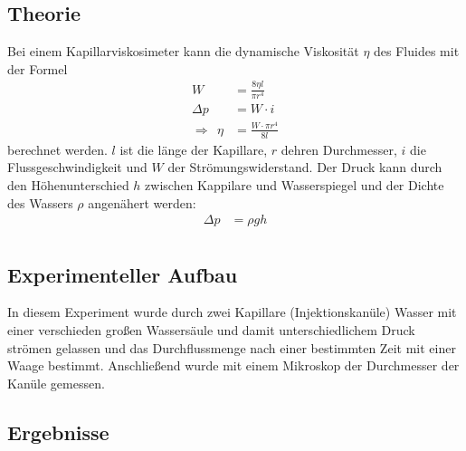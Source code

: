 \documentclass[11pt, a4paper]{article}
\begin{document}
    \subsection{Theorie}

    Bei einem Kapillarviskosimeter kann die dynamische Viskosität $\eta$ des Fluides mit der Formel
    \begin{align}
        W &= \frac{8 \eta l}{\pi r^4} \\
        \Delta p &= W \cdot i \\
        \Rightarrow \ \ \eta &= \frac{W \cdot \pi r^4}{8 l}
    \end{align}
    berechnet werden. $l$ ist die länge der Kapillare, $r$ dehren Durchmesser, $i$ die Flussgeschwindigkeit und $W$ der
    Strömungswiderstand. Der Druck kann durch den Höhenunterschied $h$ zwischen Kappilare und Wasserspiegel und der Dichte des Wassers $\rho$ angenähert werden:
    \begin{align}
        \Delta p &= \rho g h \\
    \end{align}

    \subsection{Experimenteller Aufbau}

    In diesem Experiment wurde durch zwei Kapillare (Injektionskanüle)
    Wasser mit einer verschieden großen Wassersäule und damit unterschiedlichem Druck strömen gelassen
    und das Durchflussmenge nach einer bestimmten Zeit mit einer Waage bestimmt. Anschließend wurde mit einem
    Mikroskop der Durchmesser der Kanüle gemessen.

    \subsection{Ergebnisse}
\end{document}
